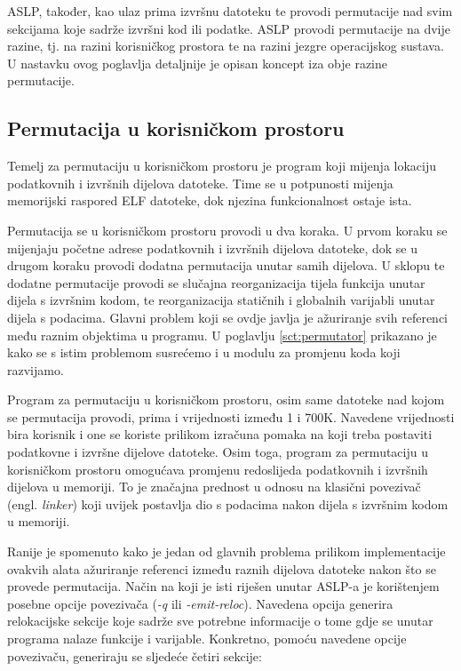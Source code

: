 \documentclass[times, utf8, diplomski, numeric]{fer}
\begin{document}
ASLP, također, kao ulaz prima izvršnu datoteku te provodi
permutacije nad svim sekcijama koje sadrže izvršni kod ili
podatke. ASLP provodi permutacije na dvije razine, tj. na razini
korisničkog prostora te na razini jezgre operacijskog sustava. U
nastavku ovog poglavlja detaljnije je opisan koncept iza obje
razine permutacije.

\subsection{Permutacija u korisničkom prostoru}

Temelj za permutaciju u korisničkom prostoru je program koji
mijenja lokaciju podatkovnih i izvršnih dijelova datoteke. Time
se u potpunosti mijenja memorijski raspored ELF datoteke, dok
njezina funkcionalnost ostaje ista.

Permutacija se u korisničkom prostoru provodi u dva koraka. U
prvom koraku se mijenjaju početne adrese podatkovnih i izvršnih
dijelova datoteke, dok se u drugom koraku provodi dodatna
permutacija unutar samih dijelova. U sklopu te dodatne
permutacije provodi se slučajna reorganizacija tijela funkcija
unutar dijela s izvršnim kodom, te reorganizacija statičnih i
globalnih varijabli unutar dijela s podacima. Glavni problem koji
se ovdje javlja je ažuriranje svih referenci među raznim objektima u
programu. U poglavlju \ref{sct:permutator} prikazano je kako se s 
istim problemom susrećemo i u modulu za promjenu koda koji razvijamo.

Program za permutaciju u korisničkom prostoru, osim same datoteke
nad kojom se permutacija provodi, prima i vrijednosti između 1 i
700K. Navedene vrijednosti bira korisnik i one se koriste
prilikom izračuna pomaka na koji treba postaviti podatkovne i
izvršne dijelove datoteke. Osim toga, program za permutaciju u
korisničkom prostoru omogućava promjenu redoslijeda podatkovnih i
izvršnih dijelova u memoriji. To je značajna prednost u odnosu na
klasični povezivač (engl. \emph{linker}) koji uvijek postavlja dio
s podacima nakon dijela s izvršnim kodom u memoriji.

Ranije je spomenuto kako je jedan od glavnih problema prilikom
implementacije ovakvih alata ažuriranje referenci između raznih
dijelova datoteke nakon što se provede permutacija. Način na koji
je isti riješen unutar ASLP-a je korištenjem posebne opcije
povezivača (\emph{-q} ili \emph{-emit-reloc}). Navedena opcija
generira relokacijske sekcije koje sadrže sve potrebne
informacije o tome gdje se unutar programa nalaze funkcije i
varijable. Konkretno, pomoću navedene opcije povezivaču,
generiraju se sljedeće četiri sekcije:
\end{document}

